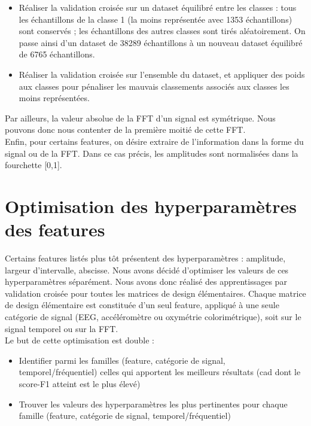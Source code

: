 \documentclass{article}
\begin{document}
\begin{itemize}
\item Réaliser la validation croisée sur un dataset équilibré entre les classes : tous les échantillons de la classe 1 (la moins représentée avec 1353 échantillons) sont conservés ; les échantillons des autres classes sont tirés aléatoirement. On passe ainsi d'un dataset de 38289 échantillons à un nouveau dataset équilibré de 6765 échantillons. 
\item Réaliser la validation croisée sur l'ensemble du dataset, et appliquer des poids aux classes pour pénaliser les mauvais classements associés aux classes les moins représentées.
\end{itemize}
\vspace{0.5cm}

Par ailleurs, la valeur absolue de la FFT d'un signal est symétrique. Nous pouvons donc nous contenter de la première moitié de cette FFT. \\

Enfin, pour certains features, on désire extraire de l'information dans la forme du signal ou de la FFT. Dans ce cas précis, les amplitudes sont normalisées dans la fourchette [0,1].\\

\section{Optimisation des hyperparamètres des features}

Certains features listés plus tôt présentent des hyperparamètres : amplitude, largeur d'intervalle, abscisse. Nous avons décidé d'optimiser les valeurs de ces hyperparamètres séparément. Nous avons donc réalisé des apprentissages par validation croisée pour toutes les matrices de design élémentaires. Chaque matrice de design élémentaire est constituée d'un seul feature, appliqué à une seule catégorie de signal (EEG, accéléromètre ou oxymétrie colorimétrique), soit sur le signal temporel ou sur la FFT.\\

Le but de cette optimisation est double :\\
\begin{itemize}
\item Identifier parmi les familles (feature, catégorie de signal, temporel/fréquentiel) celles qui apportent les meilleurs résultats (cad dont le score-F1 atteint est le plus élevé)
\item Trouver les valeurs des hyperparamètres les plus pertinentes pour chaque famille (feature, catégorie de signal, temporel/fréquentiel)
\end{itemize}
\vspace{0.5cm}
\end{document}
